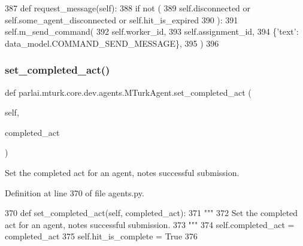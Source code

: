 \begin{DoxyCode}
387     \textcolor{keyword}{def }request\_message(self):
388         \textcolor{keywordflow}{if} \textcolor{keywordflow}{not} (
389             self.disconnected \textcolor{keywordflow}{or} self.some\_agent\_disconnected \textcolor{keywordflow}{or} self.hit\_is\_expired
390         ):
391             self.m\_send\_command(
392                 self.worker\_id,
393                 self.assignment\_id,
394                 \{\textcolor{stringliteral}{'text'}: data\_model.COMMAND\_SEND\_MESSAGE\},
395             )
396 
\end{DoxyCode}
\mbox{\label{classparlai_1_1mturk_1_1core_1_1dev_1_1agents_1_1MTurkAgent_a165678febc290547dfdbcf03eda747ba}} 
\subsubsection{\texorpdfstring{set\+\_\+completed\+\_\+act()}{set\_completed\_act()}}
{\footnotesize\ttfamily def parlai.\+mturk.\+core.\+dev.\+agents.\+M\+Turk\+Agent.\+set\+\_\+completed\+\_\+act (\begin{DoxyParamCaption}\item[{}]{self,  }\item[{}]{completed\+\_\+act }\end{DoxyParamCaption})}

\begin{DoxyVerb}Set the completed act for an agent, notes successful submission.
\end{DoxyVerb}
 

Definition at line 370 of file agents.\+py.


\begin{DoxyCode}
370     \textcolor{keyword}{def }set\_completed\_act(self, completed\_act):
371         \textcolor{stringliteral}{"""}
372 \textcolor{stringliteral}{        Set the completed act for an agent, notes successful submission.}
373 \textcolor{stringliteral}{        """}
374         self.completed\_act = completed\_act
375         self.hit\_is\_complete = \textcolor{keyword}{True}
376 
\end{DoxyCode}
\mbox{\label{classparlai_1_1mturk_1_1core_1_1dev_1_1agents_1_1MTurkAgent_ade82426c779f110dc1b5f5b309e4a281}} 
